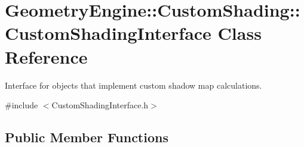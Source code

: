 \hypertarget{class_geometry_engine_1_1_custom_shading_1_1_custom_shading_interface}{}\section{Geometry\+Engine\+::Custom\+Shading\+::Custom\+Shading\+Interface Class Reference}
\label{class_geometry_engine_1_1_custom_shading_1_1_custom_shading_interface}


Interface for objects that implement custom shadow map calculations.  




{\ttfamily \#include $<$Custom\+Shading\+Interface.\+h$>$}

\subsection*{Public Member Functions}
